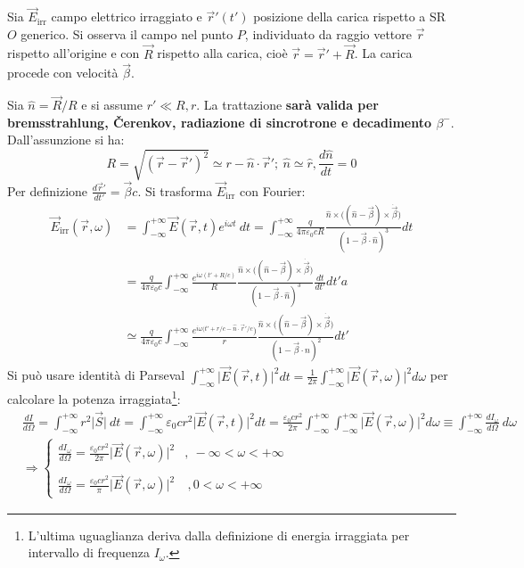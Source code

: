 \documentclass[10pt, a4paper]{scrartcl}
\numberwithin{equation}{subsection}
\theoremstyle{style1}
\begin{document}
Sia $\vec{E}_\text{irr}$ campo elettrico irraggiato e $\vec{r}'(t')$ posizione della carica rispetto a SR $O$ generico. Si osserva il campo nel punto $P$, individuato da raggio vettore $\vec{r}$ rispetto all'origine e con $\vec{R}$ rispetto alla carica, cio\`e $\vec{r}= \vec{r}' + \vec{R}$. La carica procede con velocit\`a $\vec{\beta }$.

Sia $\hat{n} = \vec{R}/R$ e si assume $r' \ll R , r$. La trattazione \textbf{sar\`a valida per bremsstrahlung, \v Cerenkov, radiazione di sincrotrone e decadimento $\beta ^-$}. Dall'assunzione si ha:
\[
R = \sqrt{(\vec{r}-\vec{r}')^2} \simeq r - \hat{n}\cdot \vec{r}'; \ \hat{n} \simeq \hat{r}, \frac{d \hat{n}}{d t} = 0
\] 
Per definizione $\frac{d \vec{r}'}{d t'} = \vec{\beta }c$. Si trasforma $\vec{E}_\text{irr}$ con Fourier:
\begin{equation}
	\begin{split}
		\vec{E}_\text{irr}(\vec{r},\omega)&= \int_{-\infty} ^{+\infty} \vec{E}(\vec{r},t) e^{i\omega t} \ dt =\int_{-\infty} ^{+\infty} \frac{q}{4\pi \varepsilon _0 c R}\frac{\hat{n}\times \big((\hat{n}-\vec{\beta }) \times \dot{ \vec{\beta }}\big)}{(1- \vec{\beta }\cdot \hat{n})^3} dt\\
						  &=\frac{q}{4\pi \varepsilon _0 c} \int_{-\infty} ^{+\infty} \frac{e^{i\omega (t' + R / c)} }{R} \frac{\hat{n}\times \big((\hat{n}-\vec{\beta }) \times \dot{\vec{\beta }}\big)}{(1-\vec{\beta }\cdot \hat{n})^3} \frac{d t}{d t'} dt'a\\
						  &\simeq \frac{q}{4\pi \varepsilon _0 c} \int_{-\infty} ^{+\infty}  \frac{e^{i\omega(t' + r / c - \hat{n}\cdot \vec{r}' / c} )}{r} \frac{\hat{n}\times \big((\hat{n}-\vec{\beta }) \times \dot{\vec{\beta }}\big)}{(1-\vec{\beta }\cdot \hat{n})^2}dt'
	\end{split}
\end{equation}
Si pu\`o usare identit\`a di Parseval $\int_{-\infty} ^{+\infty} \lvert \vec{E}(\vec{r},t) \rvert ^2  dt=\frac{1}{2\pi} \int_{-\infty} ^{+\infty} \lvert \vec{E}(\vec{r},\omega) \rvert ^2  d\omega$ per calcolare la potenza irraggiata\footnote{L'ultima uguaglianza deriva dalla definizione di energia irraggiata per intervallo di frequenza $I_\omega$.}:
\begin{equation}
	\begin{split}
		&\frac{d I}{d \Omega } = \int_{-\infty} ^{+\infty} r^2 \lvert \vec{S} \rvert \ dt = \int_{-\infty} ^{+\infty} \varepsilon _0 cr^2 \lvert \vec{E}(\vec{r},t) \rvert ^2 dt = \frac{\varepsilon _0 cr^2}{2\pi} \int_{-\infty} ^{+\infty} \int_{-\infty} ^{+\infty} \lvert \vec{E}(\vec{r},\omega) \rvert ^2 d\omega \equiv \int_{-\infty} ^{+\infty} \frac{d I_\omega}{d \Omega } \ d\omega\\
		&\Rightarrow \begin{cases}
			\displaystyle \frac{d I_\omega}{d \Omega } = \frac{\varepsilon _0 cr^2}{2\pi} \lvert \vec{E}(\vec{r},\omega) \rvert ^2 & ,\ -\infty<\omega <+\infty\\
			\\
			\displaystyle \frac{d I_\omega}{d \Omega }  = \frac{\varepsilon _0 cr^2}{\pi} \lvert \vec{E}(\vec{r},\omega) \rvert ^2& \ , 0<\omega < +\infty	
		\end{cases}
	\end{split}
\end{equation}
\end{document}
